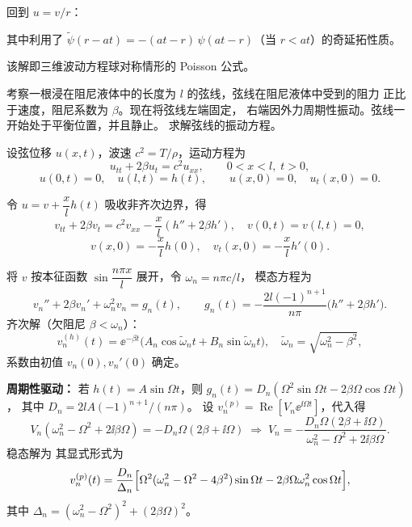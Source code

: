 \begin{question}[三维球对称波动方程]
\begin{solution}
回到 $u = v/r$：

其中利用了 $\tilde\psi(r-at) = -(at-r)\,\psi(at-r)$（当 $r<at$）的奇延拓性质。

该解即三维波动方程球对称情形的 Poisson 公式。

\end{solution}
\end{question}

\begin{question}[阻尼弦的受迫振动]

考察一根浸在阻尼液体中的长度为 $l$ 的弦线，弦线在阻尼液体中受到的阻力
正比于速度，阻尼系数为 $\beta$。现在将弦线左端固定，
右端因外力周期性振动。弦线一开始处于平衡位置，并且静止。
求解弦线的振动方程。

\begin{solution}

设弦位移 $u(x,t)$，波速 $c^2=T/\rho$，运动方程为
\[
u_{tt}+2\beta u_t = c^2 u_{xx},\qquad 0<x<l,\;t>0,
\]
\[
u(0,t)=0,\quad u(l,t)=h(t),\qquad
u(x,0)=0,\quad u_t(x,0)=0.
\]

令 $u=v+\dfrac{x}{l}h(t)$ 吸收非齐次边界，得
\[
v_{tt}+2\beta v_t = c^2 v_{xx}-\dfrac{x}{l}(h''+2\beta h'),\quad
v(0,t)=v(l,t)=0,
\]
\[
v(x,0)=-\dfrac{x}{l}h(0),\quad v_t(x,0)=-\dfrac{x}{l}h'(0).
\]

将 $v$ 按本征函数 $\sin\dfrac{n\pi x}{l}$ 展开，令 $\omega_n=n\pi c/l$，
模态方程为
\[
v_n''+2\beta v_n'+\omega_n^2 v_n = g_n(t),\qquad
g_n(t)=-\frac{2l(-1)^{n+1}}{n\pi}\bigl(h''+2\beta h'\bigr).
\]
齐次解（欠阻尼 $\beta<\omega_n$）：
\[
v_n^{(h)}(t)=\ee^{-\beta t}\bigl(A_n\cos\tilde\omega_n t+B_n\sin\tilde\omega_n t\bigr),\quad
\tilde\omega_n=\sqrt{\omega_n^2-\beta^2},
\]
系数由初值 $v_n(0),v_n'(0)$ 确定。

\noindent\textbf{周期性驱动：} 若 $h(t)=A\sin\Omega t$，则
$g_n(t)=D_n(\Omega^2\sin\Omega t-2\beta\Omega\cos\Omega t)$，
其中 $D_n=2lA(-1)^{n+1}/(n\pi)$。
设 $v_n^{(p)}=\operatorname{Re}[V_n\ee^{\ii\Omega t}]$，代入得
\[
V_n(\omega_n^2-\Omega^2+2\ii\beta\Omega)
= -D_n\Omega(2\beta+\ii\Omega)
\;\Longrightarrow\;
V_n = -\frac{D_n\Omega(2\beta+\ii\Omega)}
{\omega_n^2-\Omega^2+2\ii\beta\Omega}.
\]
稳态解为
其显式形式为
\[
v_n^{(p)}(t)=\frac{D_n}{\Delta_n}\Bigl[
\Omega^2(\omega_n^2-\Omega^2-4\beta^2)\sin\Omega t
-2\beta\Omega\omega_n^2\cos\Omega t
\Bigr],
\]
其中 $\Delta_n=(\omega_n^2-\Omega^2)^2+(2\beta\Omega)^2$。


\end{solution}
\end{question}

